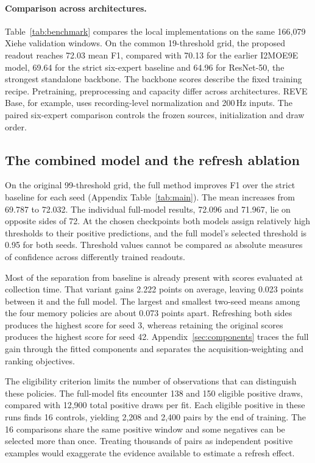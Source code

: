 \documentclass{article}
\begin{document}
\paragraph{Comparison across architectures.}
Table~\ref{tab:benchmark} compares the local implementations on the same 166,079 Xiehe validation windows. On the common 19-threshold grid, the proposed readout reaches 72.03 mean F1, compared with 70.13 for the earlier I2MOE9E model, 69.64 for the strict six-expert baseline and 64.96 for ResNet-50, the strongest standalone backbone. The backbone scores describe the fixed training recipe. Pretraining, preprocessing and capacity differ across architectures. REVE Base, for example, uses recording-level normalization and 200\,Hz inputs. The paired six-expert comparison controls the frozen sources, initialization and draw order.
\subsection{The combined model and the refresh ablation}
On the original 99-threshold grid, the full method improves F1 over the strict baseline for each seed (Appendix Table~\ref{tab:main}). The mean increases from 69.787 to 72.032. The individual full-model results, 72.096 and 71.967, lie on opposite sides of 72. At the chosen checkpoints both models assign relatively high thresholds to their positive predictions, and the full model's selected threshold is 0.95 for both seeds. Threshold values cannot be compared as absolute measures of confidence across differently trained readouts.

Most of the separation from baseline is already present with scores evaluated at collection time. That variant gains 2.222 points on average, leaving 0.023 points between it and the full model. The largest and smallest two-seed means among the four memory policies are about 0.073 points apart. Refreshing both sides produces the highest score for seed 3, whereas retaining the original scores produces the highest score for seed 42. Appendix~\ref{sec:components} traces the full gain through the fitted components and separates the acquisition-weighting and ranking objectives.

The eligibility criterion limits the number of observations that can distinguish these policies. The full-model fits encounter 138 and 150 eligible positive draws, compared with 12,900 total positive draws per fit. Each eligible positive in these runs finds 16 controls, yielding 2,208 and 2,400 pairs by the end of training. The 16 comparisons share the same positive window and some negatives can be selected more than once. Treating thousands of pairs as independent positive examples would exaggerate the evidence available to estimate a refresh effect.
\end{document}
